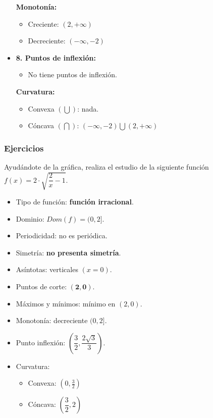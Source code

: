 \begin{itemize}
\begin{itemize}
	\end{itemize}
	\textbf{Monotonía: }
	\begin{itemize}
		\item Creciente: $(2, +\infty)$
		\item Decreciente: $(-\infty, -2)$
	\end{itemize}
	\item \textbf{8. Puntos de inflexión: }\\
	\begin{itemize}
		\item No tiene puntos de inflexión.
	\end{itemize}
	\textbf{Curvatura: }
	\begin{itemize}
		\item Convexa $(\bigcup)$: nada.
		\item Cóncava $(\bigcap)$: $(-\infty, -2) \bigcup (2, +\infty)$
	\end{itemize}
\end{itemize}
\subsubsection{Ejercicios}
\begin{ex}
	Ayudándote de la gráfica, realiza el estudio de la siguiente función $f(x)=2 \cdot \sqrt{\dfrac{2}{x}-1}$.
	\begin{sol}
		\begin{itemize}
			\item Tipo de función: \textbf{función irracional}.
			\item Dominio: $Dom(f) = (0,2]$.
			\item Periodicidad: no es periódica.
			\item Simetría: \textbf{no presenta simetría}.
			\item Asíntotas: verticales $(x=0)$.
			\item Puntos de corte: $\mathbf{(2,0)}$.
			\item Máximos y mínimos: mínimo en $(2,0)$.
			\item Monotonía: decreciente $(0,2]$.
			\item Punto inflexión: $(\dfrac{3}{2},\dfrac{2\sqrt{3}}{3})$.
			\item Curvatura:
			\begin{itemize}
				\item Convexa: $(0, \frac{3}{2})$
			\item Cóncava: $(\dfrac{3}{2},2)$
		\end{itemize}
	\end{itemize}
\end{sol}
\end{ex}
